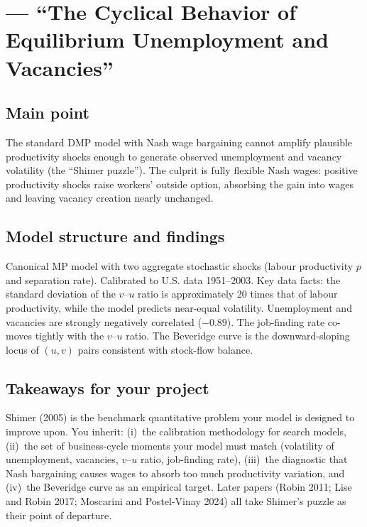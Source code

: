 \documentclass[12pt]{article}
\begin{document}
\section{\citet{shimer2005} --- ``The Cyclical Behavior of Equilibrium Unemployment and Vacancies''}

\subsection*{Main point}

The standard DMP model with Nash wage bargaining cannot amplify plausible productivity shocks enough to generate observed unemployment and vacancy volatility (the ``Shimer puzzle''). The culprit is fully flexible Nash wages: positive productivity shocks raise workers' outside option, absorbing the gain into wages and leaving vacancy creation nearly unchanged.

\subsection*{Model structure and findings}

Canonical MP model with two aggregate stochastic shocks (labour productivity $p$ and separation rate). Calibrated to U.S. data 1951--2003. Key data facts: the standard deviation of the $v$--$u$ ratio is approximately 20 times that of labour productivity, while the model predicts near-equal volatility. Unemployment and vacancies are strongly negatively correlated ($-0.89$). The job-finding rate co-moves tightly with the $v$--$u$ ratio. The Beveridge curve is the downward-sloping locus of $(u,v)$ pairs consistent with stock-flow balance.

\subsection*{Takeaways for your project}

Shimer (2005) is the benchmark quantitative problem your model is designed to improve upon. You inherit: (i)~the calibration methodology for search models, (ii)~the set of business-cycle moments your model must match (volatility of unemployment, vacancies, $v$--$u$ ratio, job-finding rate), (iii)~the diagnostic that Nash bargaining causes wages to absorb too much productivity variation, and (iv)~the Beveridge curve as an empirical target. Later papers (Robin 2011; Lise and Robin 2017; Moscarini and Postel-Vinay 2024) all take Shimer's puzzle as their point of departure.
\end{document}
